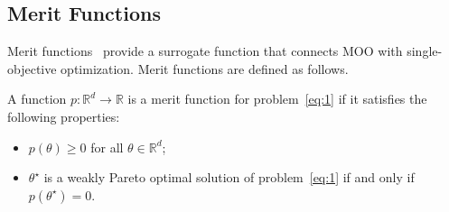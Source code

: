 \documentclass[sigconf]{acmart}
\begin{document}
\subsection{Merit Functions}
Merit functions~\cite{patriksson1997merit,charitha2013note,pappalardo2016merit} provide a surrogate function that connects MOO with single-objective optimization. Merit functions are defined as follows.
\begin{definition}
\label{def_merit_function}
A function $p:\mathbb{R}^d\to\mathbb{R}$ is a merit function for problem~\eqref{eq:1}
if it satisfies the following properties:
\begin{itemize}
    \item $p(\theta)\ge 0$ for all $\theta\in\mathbb{R}^d$;
    \item $\theta^\star$ is a weakly Pareto optimal solution of problem~\eqref{eq:1} if and only if $p(\theta^\star)=0$.
\end{itemize}
\end{definition}


 



\end{document}
